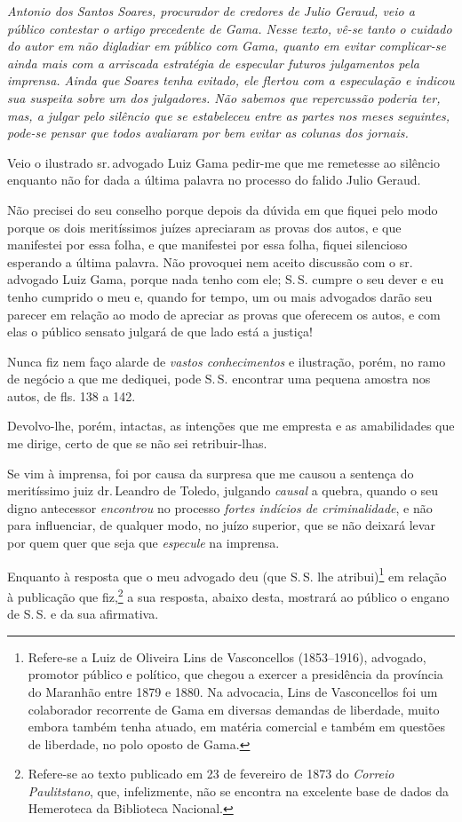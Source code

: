 \begin{didascalia}
\emph{Antonio dos Santos Soares, procurador de credores de Julio Geraud,
veio a público contestar o artigo precedente de Gama. Nesse texto, vê-se
tanto o cuidado do autor em não digladiar em público com Gama, quanto em
evitar complicar-se ainda mais com a arriscada estratégia de especular
futuros julgamentos pela imprensa. Ainda que Soares tenha evitado, ele
flertou com a especulação e indicou sua suspeita sobre um dos
julgadores. Não sabemos que repercussão poderia ter, mas, a julgar pelo
silêncio que se estabeleceu entre as partes nos meses seguintes, pode-se
pensar que todos avaliaram por bem evitar as colunas dos jornais.}
\end{didascalia}

Veio o ilustrado sr.\,advogado Luiz Gama pedir-me que me remetesse ao
silêncio enquanto não for dada a última palavra no processo do falido
Julio Geraud.

Não precisei do seu conselho porque depois da dúvida em que fiquei pelo
modo porque os dois meritíssimos juízes apreciaram as provas dos autos,
e que manifestei por essa folha, e que manifestei por essa folha, fiquei
silencioso esperando a última palavra. Não provoquei nem aceito
discussão com o sr.\,advogado Luiz Gama, porque nada tenho com ele; S.\,S.
cumpre o seu dever e eu tenho cumprido o meu e, quando for tempo, um ou
mais advogados darão seu parecer em relação ao modo de apreciar as
provas que oferecem os autos, e com elas o público sensato julgará de
que lado está a justiça!

Nunca fiz nem faço alarde de \emph{vastos conhecimentos} e ilustração,
porém, no ramo de negócio a que me dediquei, pode S.\,S. encontrar uma
pequena amostra nos autos, de fls. 138 a 142.

Devolvo-lhe, porém, intactas, as intenções que me empresta e as
amabilidades que me dirige, certo de que se não sei retribuir-lhas.

Se vim à imprensa, foi por causa da surpresa que me causou a sentença do
meritíssimo juiz dr.\,Leandro de Toledo, julgando \emph{causal} a quebra,
quando o seu digno antecessor \emph{encontrou} no processo \emph{fortes
indícios de criminalidade}, e não para influenciar, de qualquer modo, no
juízo superior, que se não deixará levar por quem quer que seja que
\emph{especule} na imprensa.

Enquanto à resposta que o meu advogado deu (que S.\,S. lhe
atribui)\footnote{ Refere-se a Luiz de Oliveira Lins de Vasconcellos
  (1853--1916), advogado, promotor público e político, que chegou a
  exercer a presidência da província do Maranhão entre 1879 e 1880. Na
  advocacia, Lins de Vasconcellos foi um colaborador recorrente de Gama
  em diversas demandas de liberdade, muito embora também tenha atuado,
  em matéria comercial e também em questões de liberdade, no polo oposto
  de Gama.} em relação à publicação que fiz,\footnote{ Refere-se ao
  texto publicado em 23 de fevereiro de 1873 do \emph{Correio Paulitstano}, que,
  infelizmente, não se encontra na excelente base de dados da Hemeroteca
  da Biblioteca Nacional.} a sua resposta, abaixo desta, mostrará ao
público o engano de S.\,S. e da sua afirmativa.

